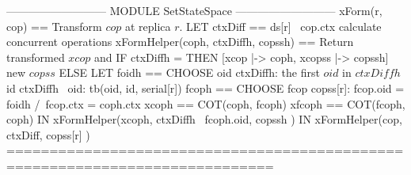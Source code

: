 \documentclass{article}
\begin{document}
\begin{tla}
--------------------------- MODULE SetStateSpace ---------------------------
xForm(r, cop) == \* Transform $cop$ at replica $r$.
    LET ctxDiff == ds[r] \ cop.ctx \* calculate concurrent operations
        xFormHelper(coph, ctxDiffh, copssh) == \* Return transformed $xcop$ and
            IF ctxDiffh = {} THEN [xcop |-> coph, xcopss |-> copssh] \* new $copss$ 
            ELSE LET foidh == CHOOSE oid \in ctxDiffh: \* the first $oid$ in $ctxDiffh$ 
                                \A id \in ctxDiffh \ {oid}: tb(oid, id, serial[r]) 
                     fcoph == CHOOSE fcop \in copss[r]: 
                                fcop.oid = foidh /\ fcop.ctx = coph.ctx \* \cc
                     xcoph == COT(coph, fcoph)
                    xfcoph == COT(fcoph, coph)
                 IN  xFormHelper(xcoph, ctxDiffh \ {fcoph.oid}, 
                                        copssh )
    IN  xFormHelper(cop, ctxDiff, copss[r] ) 
=============================================================================
\end{tla}
\end{document}
